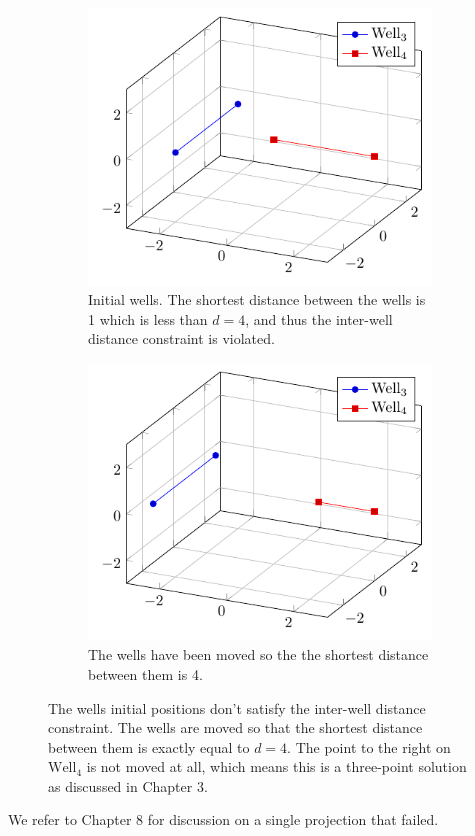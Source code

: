 \begin{figure}[H]
	\centering
	\begin{subfigure}{0.44\textwidth}
		\centering
		\includegraphics[width=1\textwidth]{figures/interwell_distance_two_wells/initial_2.pdf}
		\caption{Initial wells. The shortest distance between the wells is 1 which is
								 less than $d=4$, and thus the inter-well distance constraint is
								 violated.}
	\end{subfigure}%
	\hspace{.05\linewidth}
	\begin{subfigure}{0.44\textwidth}
		\centering
		\includegraphics[width=1\textwidth]{figures/interwell_distance_two_wells/initial_2_moved.pdf}
		\caption{The wells have been moved so the the shortest distance between them is 4.}
	\end{subfigure}%
	\caption{The wells initial positions don't satisfy the inter-well distance constraint. The wells
						are moved so that the shortest distance between them is exactly equal to $d = 4$.
						The point to the right on $\text{Well}_4$ is not moved at all, which means this
						is a three-point solution as discussed in Chapter 3.}
	\label{fig:trivial_interwell_2}
\end{figure}
%
We refer to Chapter 8 for discussion on a single projection that failed.
%
